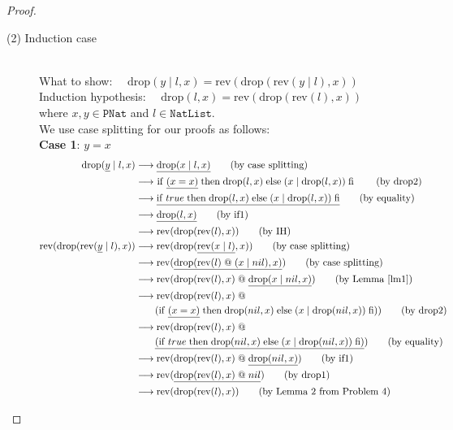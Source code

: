 \documentclass[12pt, a4paper]{article}
\newcommand{\rel}[1]{\mathrel{#1}}
\newcommand{\rmx}[1]{\mathrm{#1}}
\newcommand{\larrow}{\longrightarrow}
\newcommand{\under}{\underline}
\begin{document}
\begin{proof}
\begin{description}
\item[(2) Induction case]~\\
What to show: $\quad \rmx{drop}(y \rel{|} l, x) = \rmx{rev}(\rmx{drop}(\rmx{rev}(y \rel{|} l), x))$ \\
Induction hypothesis: $\quad \rmx{drop}(l, x) = \rmx{rev}(\rmx{drop}(\rmx{rev}(l), x))$  \\
where $x, y \in \mathtt{PNat}$ and $l \in \mathtt{NatList}$. \\
We use case splitting for our proofs as follows: \\
\textbf{Case 1}: $y = x$
\begin{align*}
\rmx{drop}(\under{y} \rel{|} l, x)
	&\larrow \under{\rmx{drop}(x \rel{|} l, x)} \tag{by case splitting} \\
	&\larrow\ \rel{\rmx{if}} \under{(x = x)} \rel{\rmx{then}} \rmx{drop}(l, x) \rel{\rmx{else}} (x \rel{|} \rmx{drop}(l, x)) \rel{\rmx{fi}} \tag{by drop2} \\
	&\larrow \under{\rel{\rmx{if}} true \rel{\rmx{then}} \rmx{drop}(l, x) \rel{\rmx{else}} (x \rel{|} \rmx{drop}(l, x)) \rel{\rmx{fi}}} \tag{by equality} \\
	&\larrow \under{\rmx{drop}(l, x)} \tag{by if1} \\
	&\larrow \rmx{rev}(\rmx{drop}(\rmx{rev}(l), x)) \tag{by IH} \\
\rmx{rev}(\rmx{drop}(\rmx{rev}(\under{y} \rel{|} l), x))
	&\larrow \rmx{rev}(\rmx{drop}(\under{\rmx{rev}(x \rel{|} l)}, x)) \tag{by case splitting} \\
	&\larrow \rmx{rev}(\under{\rmx{drop}(\rmx{rev}(l) \rel{@} (x \rel{|} nil), x)}) \tag{by case splitting} \\
	&\larrow \rmx{rev}(\rmx{drop}(\rmx{rev}(l), x) \rel{@} \under{\rmx{drop}(x \rel{|} nil, x)}) \tag{by Lemma~\ref{lm1}} \\
	&\larrow \rmx{rev}(\rmx{drop}(\rmx{rev}(l), x) \rel{@} \\
	&\quad \quad (\rel{\rmx{if}} \under{(x = x)} \rel{\rmx{then}} \rmx{drop}(nil, x) \rel{\rmx{else}} (x \rel{|} \rmx{drop}(nil, x)) \rel{\rmx{fi}})) \tag{by drop2} \\
	&\larrow \rmx{rev}(\rmx{drop}(\rmx{rev}(l), x) \rel{@} \\
	&\quad \quad \under{(\rel{\rmx{if}} true \rel{\rmx{then}} \rmx{drop}(nil, x) \rel{\rmx{else}} (x \rel{|} \rmx{drop}(nil, x)) \rel{\rmx{fi}})}) \tag{by equality} \\
	&\larrow \rmx{rev}(\rmx{drop}(\rmx{rev}(l), x) \rel{@} \under{\rmx{drop}(nil, x)}) \tag{by if1} \\
	&\larrow \rmx{rev}(\under{\rmx{drop}(\rmx{rev}(l), x) \rel{@} nil}) \tag{by drop1} \\
	&\larrow \rmx{rev}(\rmx{drop}(\rmx{rev}(l), x)) \tag{by Lemma 2 from Problem 4} \\
\end{align*}


\end{description}
\end{proof}
\end{document}
